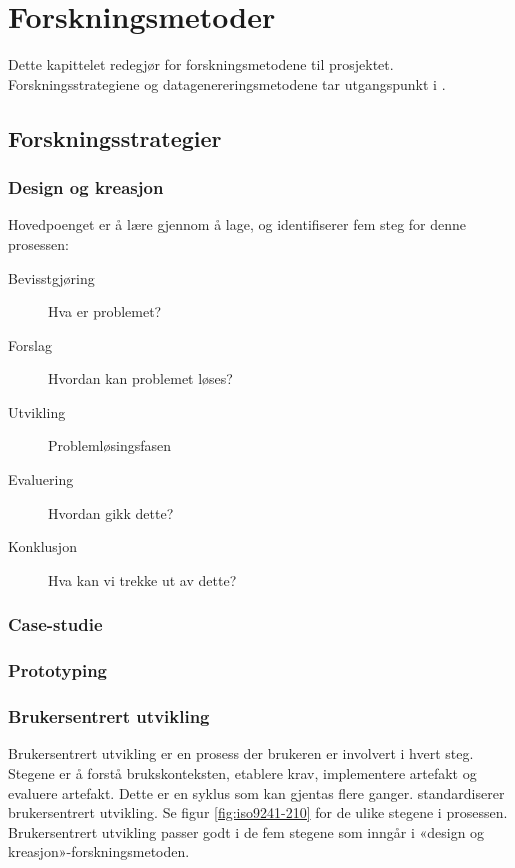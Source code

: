\chapter{Forskningsmetoder}
\label{ch:method}
Dette kapittelet redegjør for forskningsmetodene til prosjektet. Forskningsstrategiene og datagenereringsmetodene
tar utgangspunkt i \citet{oates}.

\section{Forskningsstrategier}
\blindtext

\subsection{Design og kreasjon}
Hovedpoenget er å lære gjennom å lage, og \citet{oates} identifiserer fem steg for denne prosessen:

\begin{description}
  \item[Bevisstgjøring] Hva er problemet?
  \item[Forslag] Hvordan kan problemet løses?
  \item[Utvikling] Problemløsingsfasen
  \item[Evaluering] Hvordan gikk dette?
  \item[Konklusjon] Hva kan vi trekke ut av dette?
\end{description}

\subsection{Case-studie}
    
\subsection{Prototyping}
\blindtext

\subsection{Brukersentrert utvikling}
Brukersentrert utvikling er en prosess der brukeren er involvert i hvert steg.
Stegene er å forstå brukskonteksten, etablere krav, implementere artefakt og evaluere artefakt. Dette er en syklus som kan gjentas flere ganger.
\citet{dis20099241} standardiserer brukersentrert utvikling. Se figur \ref{fig:iso9241-210}
for de ulike stegene i prosessen.
Brukersentrert utvikling passer godt i de fem stegene som inngår i «design og kreasjon»-forskningsmetoden.

